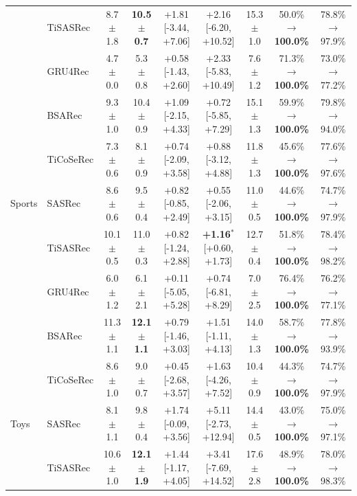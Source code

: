 \begin{table}[!htbp]
\begin{tabular*}{\textwidth}{@{\extracolsep{\fill}}llccccccc@{}}
 & TiSASRec & 8.7 $\pm$ 1.8 & \textbf{10.5 $\pm$ 0.7} & +1.81 \scriptsize{[-3.44, +7.06]} & +2.16 \scriptsize{[-6.20, +10.52]} & 15.3 $\pm$ 1.0 & 50.0\% $\to$ \textbf{100.0\%} & 78.8\% $\to$ 97.9\% \\
 & GRU4Rec & 4.7 $\pm$ 0.0 & 5.3 $\pm$ 0.8 & +0.58 \scriptsize{[-1.43, +2.60]} & +2.33 \scriptsize{[-5.83, +10.49]} & 7.6 $\pm$ 1.2 & 71.3\% $\to$ \textbf{100.0\%} & 73.0\% $\to$ 77.2\% \\
 & BSARec & 9.3 $\pm$ 1.0 & 10.4 $\pm$ 0.9 & +1.09 \scriptsize{[-2.15, +4.33]} & +0.72 \scriptsize{[-5.85, +7.29]} & 15.1 $\pm$ 1.3 & 59.9\% $\to$ \textbf{100.0\%} & 79.8\% $\to$ 94.0\% \\
 & TiCoSeRec & 7.3 $\pm$ 0.6 & 8.1 $\pm$ 0.9 & +0.74 \scriptsize{[-2.09, +3.58]} & +0.88 \scriptsize{[-3.12, +4.88]} & 11.8 $\pm$ 1.3 & 45.6\% $\to$ \textbf{100.0\%} & 77.6\% $\to$ 97.6\% \\
\midrule
Sports & SASRec & 8.6 $\pm$ 0.6 & 9.5 $\pm$ 0.4 & +0.82 \scriptsize{[-0.85, +2.49]} & +0.55 \scriptsize{[-2.06, +3.15]} & 11.0 $\pm$ 0.5 & 44.6\% $\to$ \textbf{100.0\%} & 74.7\% $\to$ 97.9\% \\
 & TiSASRec & 10.1 $\pm$ 0.5 & 11.0 $\pm$ 0.3 & +0.82 \scriptsize{[-1.24, +2.88]} & \textbf{+1.16$^{*}$} \scriptsize{[+0.60, +1.73]} & 12.7 $\pm$ 0.4 & 51.8\% $\to$ \textbf{100.0\%} & 78.4\% $\to$ 98.2\% \\
 & GRU4Rec & 6.0 $\pm$ 1.2 & 6.1 $\pm$ 2.1 & +0.11 \scriptsize{[-5.05, +5.28]} & +0.74 \scriptsize{[-6.81, +8.29]} & 7.0 $\pm$ 2.5 & 76.4\% $\to$ \textbf{100.0\%} & 76.2\% $\to$ 77.1\% \\
 & BSARec & 11.3 $\pm$ 1.1 & \textbf{12.1 $\pm$ 1.1} & +0.79 \scriptsize{[-1.46, +3.03]} & +1.51 \scriptsize{[-1.11, +4.13]} & 14.0 $\pm$ 1.3 & 58.7\% $\to$ \textbf{100.0\%} & 77.8\% $\to$ 93.9\% \\
 & TiCoSeRec & 8.6 $\pm$ 1.0 & 9.0 $\pm$ 0.7 & +0.45 \scriptsize{[-2.68, +3.57]} & +1.63 \scriptsize{[-4.26, +7.52]} & 10.4 $\pm$ 0.9 & 44.3\% $\to$ \textbf{100.0\%} & 74.7\% $\to$ 97.9\% \\
\midrule
Toys & SASRec & 8.1 $\pm$ 1.1 & 9.8 $\pm$ 0.4 & +1.74 \scriptsize{[-0.09, +3.56]} & +5.11 \scriptsize{[-2.73, +12.94]} & 14.4 $\pm$ 0.5 & 43.0\% $\to$ \textbf{100.0\%} & 75.0\% $\to$ 97.1\% \\
 & TiSASRec & 10.6 $\pm$ 1.0 & \textbf{12.1 $\pm$ 1.9} & +1.44 \scriptsize{[-1.17, +4.05]} & +3.41 \scriptsize{[-7.69, +14.52]} & 17.6 $\pm$ 2.8 & 48.9\% $\to$ \textbf{100.0\%} & 78.0\% $\to$ 98.3\% \\

\end{tabular*}
\end{table}
